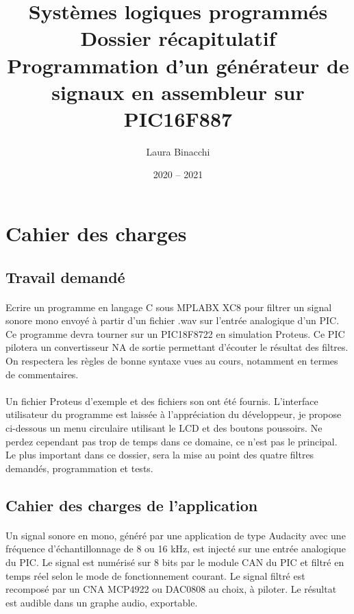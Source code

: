 \documentclass{article}
\title{Systèmes logiques programmés\bigbreak \bigbreak
    \large Dossier récapitulatif\bigbreak
    \normalsize Programmation d'un générateur de signaux en assembleur sur PIC16F887\bigbreak}
\date{2020 -- 2021}
\author{Laura Binacchi}
\begin{document}
    
    \newpage
    \tableofcontents
    \newpage

    \section{Cahier des charges}

    \subsection{Travail demandé}
    \paragraph{}
    Ecrire un programme en langage C sous MPLABX XC8 pour filtrer un signal sonore mono envoyé à partir d’un fichier .wav sur l’entrée analogique d’un PIC. Ce programme devra tourner sur un PIC18F8722 en simulation Proteus. Ce PIC pilotera un convertisseur NA de sortie permettant d’écouter le résultat des filtres. On respectera les règles de bonne syntaxe vues au cours, notamment en termes de commentaires.

    \paragraph{}
    Un fichier Proteus d’exemple et des fichiers son ont été fournis. L’interface utilisateur du programme est laissée à l’appréciation du développeur, je propose ci-dessous un menu circulaire utilisant le LCD et des boutons poussoirs. Ne perdez cependant pas trop de temps dans ce domaine, ce n’est pas le principal. Le plus important dans ce dossier, sera la mise au point des quatre filtres demandés, programmation et tests.

    \subsection{Cahier des charges de l’application}
    \paragraph{}
    Un signal sonore en mono, généré par une application de type Audacity avec une fréquence d’échantillonnage de 8 ou 16 kHz, est injecté sur une entrée analogique du PIC. Le signal est numérisé sur 8 bits par le module CAN du PIC et filtré en temps réel selon le mode de fonctionnement courant. Le signal filtré est recomposé par un CNA MCP4922 ou DAC0808 au choix, à piloter. Le résultat est audible dans un graphe audio, exportable.
\end{document}
